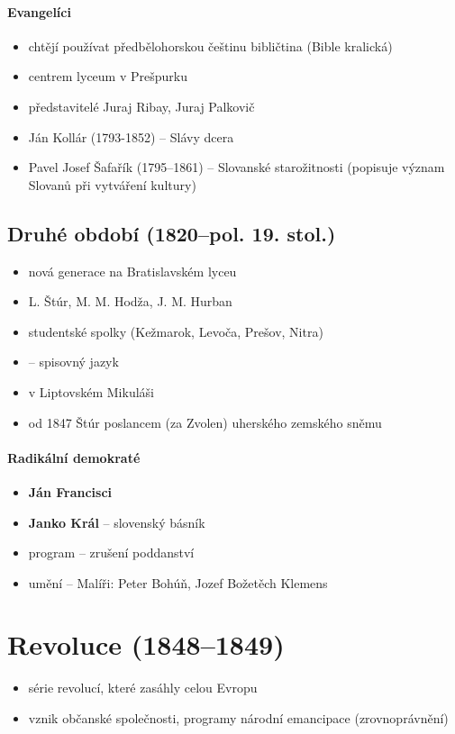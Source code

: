 \paragraph{Evangelíci}
\begin{itemize}
\item chtějí používat předbělohorskou češtinu \ra bibličtina (Bible kralická)
\item centrem lyceum v Prešpurku
\item představitelé Juraj Ribay, Juraj Palkovič
\item Ján Kollár (1793-1852) -- Slávy dcera
\item Pavel Josef Šafařík  (1795--1861) -- Slovanské starožitnosti (popisuje význam Slovanů při vytváření kultury)
\end{itemize}

\subsection{Druhé období (1820--pol. 19. stol.)}
\begin{itemize}
\item nová generace na Bratislavském lyceu
\item L. Štúr, M. M. Hodža, J. M. Hurban
\item studentské spolky (Kežmarok, Levoča, Prešov, Nitra)
\item {} -- spisovný jazyk
\item {} v Liptovském Mikuláši
\item od 1847 Štúr poslancem (za Zvolen) uherského zemského sněmu
\end{itemize}

\paragraph{Radikální demokraté}
\begin{itemize}
\item \textbf{Ján Francisci}
\item \textbf{Janko Král} -- slovenský básník
\item program -- zrušení poddanství
\item umění -- Malíři: Peter Bohúň, Jozef Božetěch Klemens
\end{itemize}

\newpage
\section{Revoluce (1848--1849)}
\begin{itemize}
\item série revolucí, které zasáhly celou Evropu
\item vznik občanské společnosti, programy národní emancipace (zrovnoprávnění)
\end{itemize}

